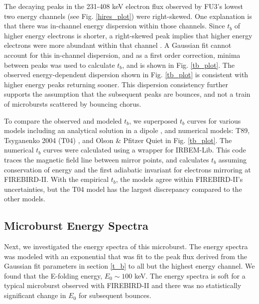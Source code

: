 \documentclass[draft, linenumbers]{agujournal}
\begin{document}
The decaying peaks in the 231-408 keV electron flux observed by FU3's lowest two energy channels (see Fig. \ref{hires_plot}) were right-skewed. One explanation is that there was in-channel energy dispersion within those channels.  Since $t_b$ of higher energy electrons is shorter, a right-skewed peak implies that higher energy electrons were more abundant within that channel . A Gaussian fit cannot account for this in-channel dispersion, and as a first order correction, minima between peaks was used to calculate $t_b$, and is shown in Fig. \ref{tb_plot}. The observed energy-dependent dispersion shown in Fig. \ref{tb_plot} is consistent with higher energy peaks returning sooner. This dispersion consistency further supports the assumption that the subsequent peaks are bounces, and not a train of microbursts scattered by bouncing chorus.

To compare the observed and modeled $t_b$, we superposed $t_b$ curves for various models including an analytical solution in a dipole \citep{Schulz1974}, and numerical models: T89, Tsyganenko 2004 (T04) \citep{Tsyganenko2005}, and Olson \& Pfitzer Quiet \citep{Olson1982} in Fig. \ref{tb_plot}. The numerical $t_b$ curves were calculated using a wrapper for IRBEM-Lib. This code traces the magnetic field line between mirror points, and calculates $t_b$ assuming conservation of energy and the first adiabatic invariant for electrons mirroring at FIREBIRD-II. With the empirical $t_b$, the models agree within FIREBIRD-II's uncertainties, but the T04 model has the largest discrepancy compared to the other models.

\subsection{Microburst Energy Spectra}
Next, we investigated the energy spectra of this microburst. The energy spectra was modeled with an exponential that was fit to the peak flux derived from the Gaussian fit parameters in section \ref{t_b} to all but the highest energy channel. We found that the E-folding energy, $E_0 \sim 100$ keV.  The energy spectra is soft for a typical microburst observed with FIREBIRD-II and there was no statistically significant change in $E_0$ for subsequent bounces.
\end{document}
